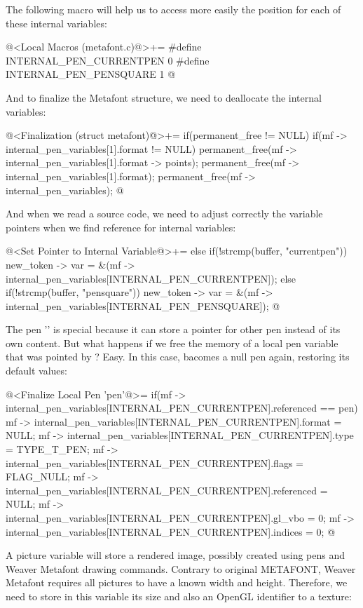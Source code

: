 The following macro will help us to access more easily the position
for each of these internal variables:

\iniciocodigo
@<Local Macros (metafont.c)@>+=
#define INTERNAL_PEN_CURRENTPEN 0
#define INTERNAL_PEN_PENSQUARE  1
@
\fimcodigo

And to finalize the Metafont structure, we need to deallocate the
internal variables:

\iniciocodigo
@<Finalization (struct metafont)@>+=
if(permanent_free != NULL){
  if(mf -> internal_pen_variables[1].format != NULL){
    permanent_free(mf -> internal_pen_variables[1].format -> points);
    permanent_free(mf -> internal_pen_variables[1].format);
  }
  permanent_free(mf -> internal_pen_variables);
}
@
\fimcodigo

And when we read a source code, we need to adjust correctly the
variable pointers when we find reference for internal variables:


\iniciocodigo
@<Set Pointer to Internal Variable@>+=
else if(!strcmp(buffer, "currentpen"))
  new_token -> var =
          &(mf -> internal_pen_variables[INTERNAL_PEN_CURRENTPEN]);
else if(!strcmp(buffer, "pensquare"))
  new_token -> var =
          &(mf -> internal_pen_variables[INTERNAL_PEN_PENSQUARE]);
@
\fimcodigo

The pen '' is special because it can store a
pointer for other pen instead of its own content. But what happens if
we free the memory of a local pen variable that was pointed
by ? Easy. In this
case,  bacomes a null pen again, restoring its
default values:

\iniciocodigo
@<Finalize Local Pen 'pen'@>=
if(mf -> internal_pen_variables[INTERNAL_PEN_CURRENTPEN].referenced == pen){
  mf -> internal_pen_variables[INTERNAL_PEN_CURRENTPEN].format = NULL;
  mf -> internal_pen_variables[INTERNAL_PEN_CURRENTPEN].type = TYPE_T_PEN;
  mf -> internal_pen_variables[INTERNAL_PEN_CURRENTPEN].flags = FLAG_NULL;
  mf -> internal_pen_variables[INTERNAL_PEN_CURRENTPEN].referenced = NULL;
  mf -> internal_pen_variables[INTERNAL_PEN_CURRENTPEN].gl_vbo = 0;
  mf -> internal_pen_variables[INTERNAL_PEN_CURRENTPEN].indices = 0;
}
@
\fimcodigo


A picture variable will store a rendered image, possibly created using
pens and Weaver Metafont drawing commands. Contrary to original
METAFONT, Weaver Metafont requires all pictures to have a known width
and height. Therefore, we need to store in this variable its size and
also an OpenGL identifier to a texture:

